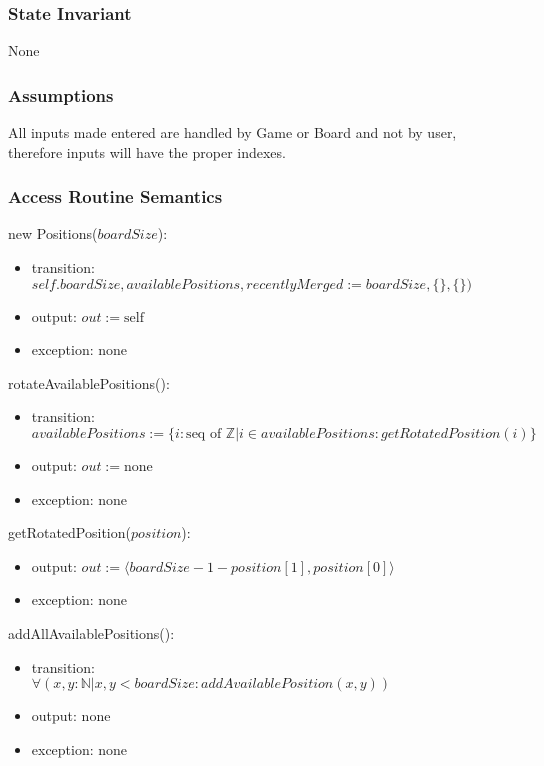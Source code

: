 \documentclass[12pt]{article}
\begin{document}
\subsubsection* {State Invariant}

None

\subsubsection* {Assumptions}

All inputs made entered are handled by Game or Board and not by user, therefore inputs will have the proper indexes.

\subsubsection* {Access Routine Semantics}

\noindent new Positions($\mathit{boardSize}$):
\begin{itemize}
\item transition: $\mathit{self.boardSize}, availablePositions, recentlyMerged := \mathit{boardSize}, \{\}, \{\})$
\item output: $out := \mbox{self}$
\item exception: none
\end{itemize}

\noindent rotateAvailablePositions():
\begin{itemize}
\item transition: \\
    $availablePositions := \{i: \text{seq of } \mathbb{Z} | i \in availablePositions :
    getRotatedPosition(i)\}$
\item output: $out := \text{none}$
\item exception: none
\end{itemize}

\noindent getRotatedPosition($position$):
\begin{itemize}

\item output: $out := \langle boardSize - 1 - position[1], position[0] \rangle$
\item exception: none
\end{itemize}

\noindent addAllAvailablePositions():
\begin{itemize}
\item transition: \\
    $\forall (x, y: \mathbb{N}| x, y < boardSize: addAvailablePosition(x, y))$
\item output: none
\item exception: none
\end{itemize}
\end{document}
